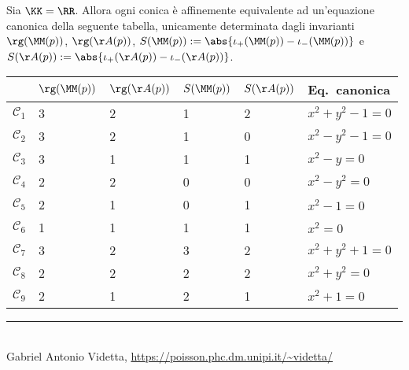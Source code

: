 \documentclass[10pt,landscape]{article}
\begin{document}
\begin{multicols}{3}
		Sia $\KK=\RR$. Allora ogni conica è affinemente equivalente ad
		un'equazione canonica della seguente tabella, unicamente
		determinata dagli invarianti $\rg(\MM(p))$, $\rg(\AA(p))$,
		$S(\MM(p)) := \abs{\iota_+(\MM(p)) - \iota_-(\MM(p))}$ e
		$S(\AA(p)) := \abs{\iota_+(\AA(p)) - \iota_-(\AA(p))}$. \\[0.1in]
		
		\begin{center}
			\tiny
			\begin{tabular}{|l|l|l|l|l|l|}
				\hline
				& $\rg(\MM(p))$ & $\rg(\AA(p))$ & $S(\MM(p))$ & $S(\AA(p))$ & Eq.~canonica \\ \hline
				$\mathcal{C}_1$ & 3 & 2 & 1 & 2 & $x^2+y^2-1=0$ \\ \hline
				$\mathcal{C}_2$ & 3 & 2 & 1 & 0 & $x^2-y^2-1=0$ \\ \hline
				$\mathcal{C}_3$ & 3 & 1 & 1 & 1 & $x^2-y=0$ \\ \hline
				$\mathcal{C}_4$ & 2 & 2 & 0 & 0 & $x^2-y^2=0$ \\ \hline
				$\mathcal{C}_5$ & 2 & 1 & 0 & 1 & $x^2-1=0$ \\ \hline
				$\mathcal{C}_6$ & 1 & 1 & 1 & 1 & $x^2=0$ \\ \hline
				$\mathcal{C}_7$ & 3 & 2 & 3 & 2 & $x^2+y^2+1=0$ \\ \hline
				$\mathcal{C}_8$ & 2 & 2 & 2 & 2 & $x^2+y^2=0$ \\ \hline
				$\mathcal{C}_9$ & 2 & 1 & 2 & 1 & $x^2+1=0$ \\ \hline
			\end{tabular}
		\end{center}
		
		\vfill
		\hrule
		~\\
		Gabriel Antonio Videtta, \url{https://poisson.phc.dm.unipi.it/~videtta/}
	\end{multicols}
	
\end{document}
